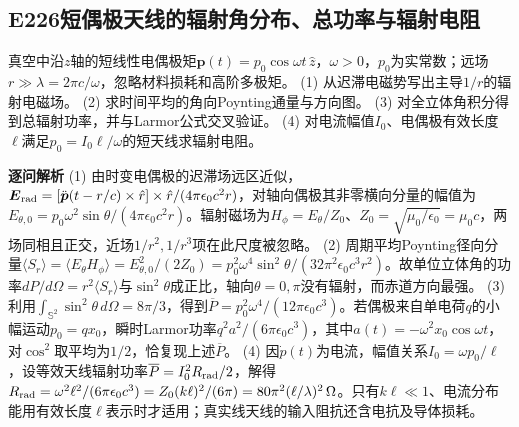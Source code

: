 \subsection*{E226\quad 短偶极天线的辐射角分布、总功率与辐射电阻}
真空中沿$z$轴的短线性电偶极矩$\boldsymbol p(t)=p_0\cos\omega t\,\hat z$，$\omega>0$，$p_0$为实常数；远场$r\gg\lambda=2\pi c/\omega$，忽略材料损耗和高阶多极矩。
(1) 从迟滞电磁势写出主导$1/r$的辐射电磁场。
(2) 求时间平均的角向Poynting通量与方向图。
(3) 对全立体角积分得到总辐射功率，并与Larmor公式交叉验证。
(4) 对电流幅值$I_0$、电偶极有效长度$\ell$满足$p_0=I_0\ell/\omega$的短天线求辐射电阻。
\par\textbf{逐问解析}
(1) 由时变电偶极的迟滞场远区近似，$\boldsymbol E_{\rm rad}=[\ddot{\boldsymbol p}(t-r/c)\times\hat r]\times\hat r/(4\pi\epsilon_0c^2r)$，对轴向偶极其非零横向分量的幅值为$E_{\theta,0}=p_0\omega^2\sin\theta/(4\pi\epsilon_0c^2r)$。辐射磁场为$H_\phi=E_\theta/Z_0$、$Z_0=\sqrt{\mu_0/\epsilon_0}=\mu_0c$，两场同相且正交，近场$1/r^2,1/r^3$项在此尺度被忽略。
(2) 周期平均Poynting径向分量$\langle S_r\rangle=\langle E_\theta H_\phi\rangle=E_{\theta,0}^2/(2Z_0)=p_0^2\omega^4\sin^2\theta/(32\pi^2\epsilon_0c^3r^2)$。故单位立体角的功率$dP/d\Omega=r^2\langle S_r\rangle$与$\sin^2\theta$成正比，轴向$\theta=0,\pi$没有辐射，而赤道方向最强。
(3) 利用$\int_{\mathbb S^2}\sin^2\theta\,d\Omega=8\pi/3$，得到$\overline P=p_0^2\omega^4/(12\pi\epsilon_0c^3)$。若偶极来自单电荷$q$的小幅运动$p_0=qx_0$，瞬时Larmor功率$q^2a^2/(6\pi\epsilon_0c^3)$，其中$a(t)=-\omega^2x_0\cos\omega t$，对$\cos^2$取平均为$1/2$，恰复现上述$\overline P$。
(4) 因$\dot p(t)$为电流，幅值关系$I_0=\omega p_0/\ell$，设等效天线辐射功率$\overline P=I_0^2R_{\rm rad}/2$，解得$R_{\rm rad}=\omega^2\ell^2/(6\pi\epsilon_0c^3)=Z_0(k\ell)^2/(6\pi)=80\pi^2(\ell/\lambda)^2\,\Omega$。只有$k\ell\ll1$、电流分布能用有效长度$\ell$表示时才适用；真实线天线的输入阻抗还含电抗及导体损耗。
\par\medskip
